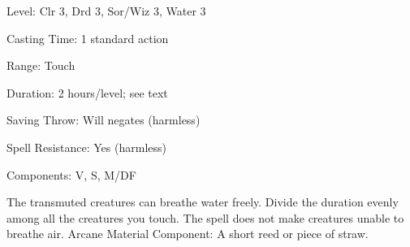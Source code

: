 
\begin{description*}
\item[Level:] Clr 3, Drd 3, Sor/Wiz 3, Water 3
\item[Casting Time:] 1 standard action
\item[Range:] Touch
\item[Duration:] 2 hours/level; see text
\item[Saving Throw:] Will negates (harmless)
\item[Spell Resistance:] Yes (harmless)
\item[Components:] V, S, M/DF
\end{description*}

The transmuted creatures can breathe water freely. Divide the duration evenly among
all the creatures you touch.
The spell does not make creatures unable to breathe air.
Arcane Material Component: A short reed or piece of straw.